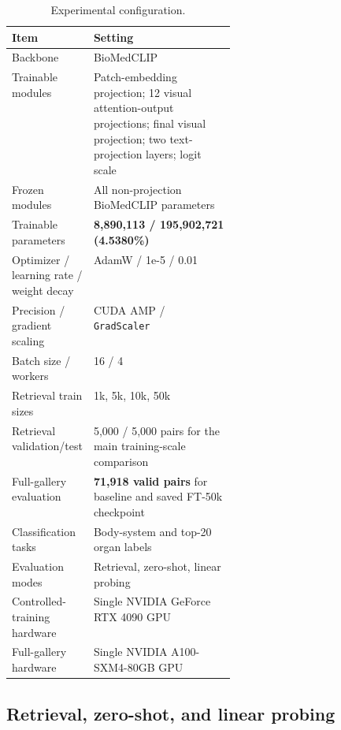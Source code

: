 \documentclass[runningheads]{llncs}
\begin{document}
\begin{table}[t]
\scriptsize
\caption{Experimental configuration.}
\label{tab:config}
\centering
\begin{tabularx}{\linewidth}{@{}p{0.33\linewidth}X@{}}
\toprule
\textbf{Item} & \textbf{Setting} \\
\midrule
Backbone & BioMedCLIP \\
Trainable modules & Patch-embedding projection; 12 visual attention-output projections; final visual projection; two text-projection layers; logit scale \\
Frozen modules & All non-projection BioMedCLIP parameters \\
Trainable parameters & \textbf{8,890,113 / 195,902,721 (4.5380\%)} \\
Optimizer / learning rate / weight decay & AdamW / 1e-5 / 0.01 \\
Precision / gradient scaling & CUDA AMP / \texttt{GradScaler} \\
Batch size / workers & 16 / 4 \\
Retrieval train sizes & 1k, 5k, 10k, 50k \\
Retrieval validation/test & 5,000 / 5,000 pairs for the main training-scale comparison \\
Full-gallery evaluation & \textbf{71,918 valid pairs} for baseline and saved FT-50k checkpoint \\
Classification tasks & Body-system and top-20 organ labels \\
Evaluation modes & Retrieval, zero-shot, linear probing \\
Controlled-training hardware & Single NVIDIA GeForce RTX 4090 GPU \\
Full-gallery hardware & Single NVIDIA A100-SXM4-80GB GPU \\
\bottomrule
\end{tabularx}
\end{table}

\subsection{Retrieval, zero-shot, and linear probing}
\end{document}
